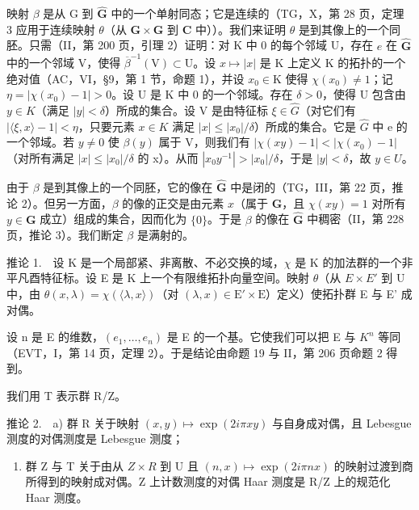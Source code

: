映射 \(\beta\) 是从 G 到 \(\widehat{\mathbf{G}}\) 中的一个单射同态；它是连续的（TG，X，第 28 页，定理 3 应用于连续映射 \(\theta\)（从 \(\mathbf{G} \times \mathbf{G}\) 到 \(\mathbf{C}\) 中））。我们来证明 \(\theta\) 是到其像上的一个同胚。只需（II，第 200 页，引理 2）证明：对 K 中 0 的每个邻域 U，存在 \(e\) 在 \(\widehat{\mathbf{G}}\) 中的一个邻域 V，使得 \(\overline{\beta}^{-1}(\mathrm{V}) \subset \mathrm{U}\)。设 \(x \mapsto |x|\) 是 K 上定义 K 的拓扑的一个绝对值（AC，VI，§9，第 1 节，命题 1），并设 \(x_0 \in \mathrm{K}\) 使得 \(\chi(x_{0}) \neq 1\)；记 \(\eta = |\chi(x_{0}) - 1| > 0\)。设 U 是 K 中 0 的一个邻域。存在 \(\delta > 0\)，使得 U 包含由 \(y \in K\)（满足 \(|y| < \delta\)）所成的集合。设 V 是由特征标 \(\xi \in \widehat{G}\)（对它们有 \(|\langle\xi, x\rangle - 1| < \eta\)，只要元素 \(x \in K\) 满足 \(|x| \leqslant |x_{0}|/\delta\)）所成的集合。它是 \(\widehat{G}\) 中 e 的一个邻域。若 \(y \neq 0\) 使 \(\beta(y)\) 属于 V，则我们有 \(|\chi(xy) - 1| < |\chi(x_{0}) - 1|\)（对所有满足 \(|x| \leqslant |x_{0}|/\delta\) 的 x）。从而 \(|x_{0}y^{-1}| > |x_{0}|/\delta\)，于是 \(|y| < \delta\)，故 \(y \in U\)。

由于 \(\beta\) 是到其像上的一个同胚，它的像在 \(\widehat{\mathbf{G}}\) 中是闭的（TG，III，第 22 页，推论 2）。但另一方面，\(\beta\) 的像的正交是由元素 \(x\)（属于 \(\mathbf{G}\)，且 \(\chi(xy) = 1\) 对所有 \(y \in \mathbf{G}\) 成立）组成的集合，因而化为 \(\{0\}\)。于是 \(\beta\) 的像在 \(\widehat{\mathbf{G}}\) 中稠密（II，第 228 页，推论 3）。我们断定 \(\beta\) 是满射的。

推论 1.　设 K 是一个局部紧、非离散、不必交换的域，\(\chi\) 是 K 的加法群的一个非平凡酉特征标。设 E 是 K 上一个有限维拓扑向量空间。映射 \(\theta\)（从 \(E \times E'\) 到 U 中，由 \(\theta(x,\lambda)=\chi(\langle\lambda,x\rangle)\)（对 \((\lambda,x)\in\mathrm{E}'\times\mathrm{E}\)）定义）使拓扑群 E 与 E' 成对偶。

设 n 是 E 的维数，\((e_{1},\ldots,e_{n})\) 是 E 的一个基。它使我们可以把 E 与 \(K^{n}\) 等同（EVT，I，第 14 页，定理 2）。于是结论由命题 19 与 II，第 206 页命题 2 得到。

我们用 T 表示群 R/Z。

推论 2.　a) 群 R 关于映射 \((x,y)\mapsto\exp(2i\pi xy)\) 与自身成对偶，且 Lebesgue 测度的对偶测度是 Lebesgue 测度；

\begin{enumerate}
\def\labelenumi{\alph{enumi})}
\setcounter{enumi}{1}
\tightlist
\item
  群 Z 与 T 关于由从 \(Z \times R\) 到 U 且 \((n, x) \mapsto \exp(2i\pi nx)\) 的映射过渡到商所得到的映射成对偶。Z 上计数测度的对偶 Haar 测度是 R/Z 上的规范化 Haar 测度。
\end{enumerate}

